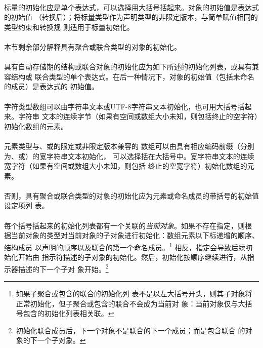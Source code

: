 {\paragraph{}
标量的初始化应是单个表达式，可以选择用大括号括起来。对象的初始值是表达式的初始值
（转换后）；将标量类型作为声明类型的非限定版本，与简单赋值相同的类型约束和转换规
则适用于标量初始化。

\paragraph{}
本节剩余部分解释具有聚合或联合类型的对象的初始化。

\paragraph{}
具有自动存储期的结构或联合对象的初始化应为如下所述的初始化列表，或具有兼容结构或
联合类型的单个表达式。在后一种情况下，对象的初始值（包括未命名的成员）是表达式的
初始值。

\paragraph{}
字符类型数组可以由字符串文本或UTF-8字符串文本初始化，也可用大括号括起来。字符串
文本的连续字节（如果有空间或数组大小未知，则包括终止的空字符）初始化数组的元素。

\paragraph{}
元素类型与、或的限定或非限定版本兼容的
数组可以由具有相应编码前缀（分别为、或）的宽字符串文本初始化，
可以选择括在大括号中。宽字符串文本的连续宽字符（如果有空间或数组大小未知，则包括
终止的空宽字符）初始化数组的元素。

\paragraph{}
否则，具有聚合或联合类型的对象的初始化应为元素或命名成员的带括号的初始值设定项列
表。

\paragraph{}
每个括号括起来的初始化列表都有一个关联的\textit{当前对象}。如果不存在指定，则根
据当前对象的类型对当前对象的子对象进行初始化：数组元素以下标递增的顺序、结构成员
以声明的顺序以及联合的第一个命名成员。\footnote{如果子聚合或包含的联合的初始化列
表不是以左大括号开头，则其子对象将正常初始化，但子聚合或包含的联合不会成为当前对
象：当前对象仅与大括号包含的初始化列表相关联。} 相反，指定会导致后续初始化开始由
指示符描述的子对象的初始化。然后，初始化按顺序继续进行，从指示器描述的下一个子对
象开始。\footnote{初始化联合成员后，下一个对象不是联合的下一个成员；而是包含联合
的对象的下一个子对象。}

}
